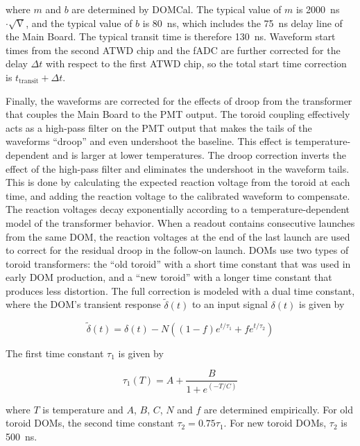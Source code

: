 \noindent where $m$ and $b$ are determined by DOMCal. The typical value of $m$
is 2000~ns$\cdot \sqrt{\mathrm{V}}$, and the typical value of $b$ is
80~ns, which includes the 75~ns delay line of the Main Board. The
typical transit time is therefore 130~ns.  Waveform start times from the
second ATWD chip and the fADC are further 
corrected for the delay $\Delta t$ with respect to the first ATWD
chip, so the total start time correction is $t_{\mathrm{transit}} + \Delta t$.

Finally, the waveforms are corrected for the effects of droop from the
transformer that couples the Main Board to the PMT output. The toroid
coupling effectively acts as a high-pass filter on the PMT output
that makes the tails of the waveforms ``droop'' and even
undershoot the baseline. This effect is temperature-dependent and is larger
at lower temperatures. The droop correction inverts the effect of the high-pass
filter and eliminates the undershoot in the waveform tails. This is
done by calculating the expected reaction voltage from the toroid at
each time, and adding the reaction voltage to the calibrated waveform
to compensate. The reaction voltages decay exponentially
according to a temperature-dependent model of the transformer behavior. 
When a readout contains consecutive launches from the same
DOM, the reaction voltages at the end of the last launch are used to
correct for the residual droop in the follow-on launch.  DOMs
use two types of toroid transformers: the ``old toroid'' with a short
time constant that was used in early DOM production, and a ``new
toroid'' with a longer time constant that produces less
distortion.  The full correction is modeled with a dual time constant,
where the DOM's transient response $\tilde{\delta}(t)$ to an input
signal $\delta(t)$ is given by

\begin{equation}
\tilde{\delta}(t) = \delta (t) - N((1 - f) e^{t/\tau_1} +f
e^{t/\tau_2})
\end{equation}

\noindent The first time constant $\tau_1$ is given by 

\begin{equation}
\tau_1(T) = A + \frac{B}{1 + e^{(-T/C)}}
\end{equation}

\noindent where $T$ is temperature and $A$, $B$, $C$, $N$ and $f$ are determined empirically.
For old toroid DOMs, the second time constant $\tau_2 =0.75\tau_1$. For new
toroid DOMs, $\tau_2$ is 500~ns.

